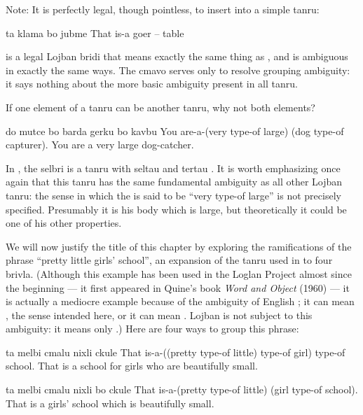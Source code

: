 Note: It is perfectly legal, though pointless, to insert
     into a simple tanru:
\begin{example}
ta klama bo jubme\n
That is-a goer -- table
\end{example}

{\noindent}is a legal Lojban bridi that means exactly the same thing as , and is ambiguous in exactly the
    same ways. The cmavo  serves only to resolve grouping
    ambiguity: it says nothing about the more basic ambiguity
    present in all tanru.



If one element of a tanru can be another tanru, why not both
    elements?
\begin{example}
do mutce bo barda gerku bo kavbu\n
You are-a-(very type-of large) (dog type-of capturer).\n
You are a very large dog-catcher.
\end{example}

In , the selbri is a tanru
    with seltau  and tertau .
    It is worth emphasizing once again that this tanru has the same
    fundamental ambiguity as all other Lojban tanru: the sense in
    which the  is said to be ``very type-of
    large'' is not precisely specified. Presumably it is his body
    which is large, but theoretically it could be one of his other
    properties.

We will now justify the title of this chapter by exploring
    the ramifications of the phrase ``pretty little girls'
    school'', an expansion of the tanru used in  to four brivla. (Although this example
    has been used in the Loglan Project almost since the beginning
    --- it first appeared in Quine's book \textit{Word and
    Object} (1960) --- it is actually a mediocre example
    because of the ambiguity of English ; it can mean
    , the sense intended here, or it can mean
    . Lojban  is not subject to this ambiguity: it
    means only .) Here are four ways to group this
    phrase:
\begin{example}
ta melbi cmalu\n
\T	nixli ckule\n
That is-a-((pretty type-of little)\n
\T	type-of girl) type-of school.\n
That is a school for girls who are beautifully small.
\end{example}

\begin{example}
ta melbi cmalu nixli bo ckule\n
That is-a-(pretty type-of little) (girl type-of school).\n
That is a girls' school which is beautifully small.
\end{example}

